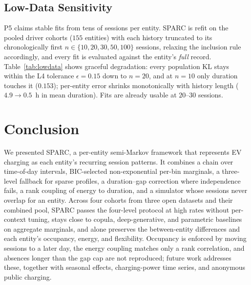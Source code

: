 \documentclass[journal]{IEEEtran}
\begin{document}
\subsection{Low-Data Sensitivity}
\label{subsec:lowdata}

P5 claims stable fits from tens of sessions per entity. SPARC is refit on the pooled driver cohorts ($155$ entities) with each history truncated to its chronologically first $n \in \{10, 20, 30, 50, 100\}$ sessions, relaxing the inclusion rule accordingly, and every fit is evaluated against the entity's \emph{full} record. Table~\ref{tab:lowdata} shows graceful degradation: every population KL stays within the L4 tolerance $\epsilon = 0.15$ down to $n = 20$, and at $n = 10$ only duration touches it ($0.153$); per-entity error shrinks monotonically with history length ($4.9 \to 0.5$~h in mean duration). Fits are already usable at $20$--$30$ sessions.

\section{Conclusion}
\label{sec:conclusion}
We presented SPARC, a per-entity semi-Markov framework that represents EV charging as each entity's recurring session patterns. It combines a chain over time-of-day intervals, BIC-selected non-exponential per-bin marginals, a three-level fallback for sparse profiles, a duration--gap correction where independence fails, a rank coupling of energy to duration, and a simulator whose sessions never overlap for an entity. Across four cohorts from three open datasets and their combined pool, SPARC passes the four-level protocol at high rates without per-context tuning, stays close to copula, deep-generative, and parametric baselines on aggregate marginals, and alone preserves the between-entity differences and each entity's occupancy, energy, and flexibility. Occupancy is enforced by moving sessions to a later day, the energy coupling matches only a rank correlation, and absences longer than the gap cap are not reproduced; future work addresses these, together with seasonal effects, charging-power time series, and anonymous public charging.



\end{document}
